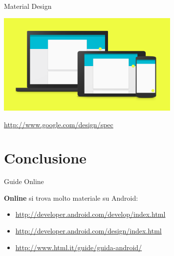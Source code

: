 \documentclass[xcolor=svgnames,11pt]{beamer}
\begin{document}
\begin{frame}{Material Design}

\begin{center}

\includegraphics[width=9cm]{material.png}

\bigskip

\url{http://www.google.com/design/spec}

\end{center}

\end{frame}

\section{Conclusione}

\begin{frame}{Guide Online}

\textbf{Online} si trova molto materiale su Android:
\pause
\medskip
\begin{itemize}
\item \small{\url{http://developer.android.com/develop/index.html}}
\pause
\item \url{http://developer.android.com/design/index.html}
\pause
\item \url{http://www.html.it/guide/guida-android/}
\end{itemize}
\end{frame}
\end{document}
